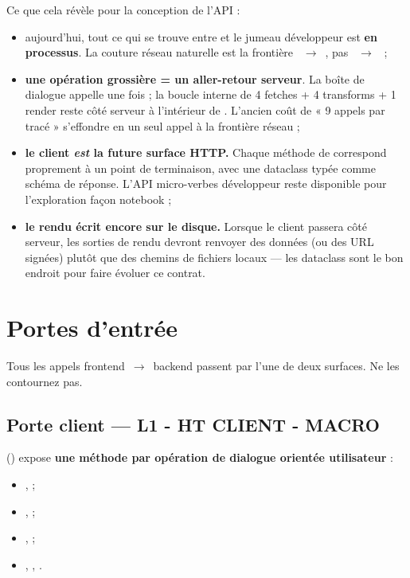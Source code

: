 Ce que cela révèle pour la conception de l'API :

\begin{itemize}
    \item aujourd'hui, tout ce qui se trouve entre  et le jumeau développeur est \textbf{en processus}. La couture réseau naturelle est la frontière ~$\rightarrow$~, pas ~$\rightarrow$~ ;
    \item \textbf{une opération grossière = un aller-retour serveur}. La boîte de dialogue appelle  une fois ; la boucle interne de 4 fetches + 4 transforms + 1 render reste côté serveur à l'intérieur de . L'ancien coût de « 9 appels par tracé » s'effondre en un seul appel à la frontière réseau ;
    \item \textbf{le client \emph{est} la future surface HTTP.} Chaque méthode de  correspond proprement à un point de terminaison, avec une dataclass typée  comme schéma de réponse. L'API micro-verbes développeur reste disponible pour l'exploration façon notebook ;
    \item \textbf{le rendu écrit encore sur le disque.} Lorsque le client passera côté serveur, les sorties de rendu devront renvoyer des données (ou des URL signées) plutôt que des chemins de fichiers locaux --- les dataclass  sont le bon endroit pour faire évoluer ce contrat.
\end{itemize}

\section{Portes d'entrée}
\label{sec-dev-gates}

Tous les appels frontend~$\rightarrow$~backend passent par l'une de deux surfaces. Ne les contournez pas.

\subsection{Porte client --- L1 - HT CLIENT - MACRO}

 () expose \textbf{une méthode par opération de dialogue orientée utilisateur} :

\begin{itemize}
    \item {},  ;
    \item {},  ;
    \item {},  ;
    \item {}, , .
\end{itemize}

